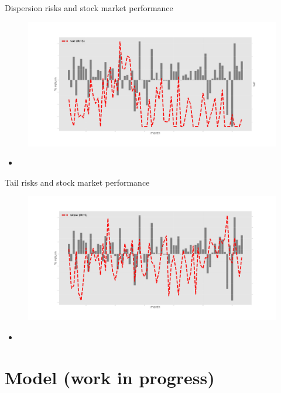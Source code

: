 \documentclass{beamer}
\begin{document}
\begin{frame}{Dispersion risks and stock market performance}
	\begin{figure}
		\centering
		\label{ts_var}
		\includegraphics[width=\textwidth]{figures/tsMedvar.jpg}
	\end{figure}
	\begin{itemize}
		\item 
	\end{itemize}
\end{frame}



\begin{frame}{Tail risks and stock market performance}
	\begin{figure}
		\centering
		\label{ts_skew}
		\includegraphics[width=\textwidth]{figures/tsEstMeanskew.jpg}
	\end{figure}
	\begin{itemize}
		\item 
	\end{itemize}
\end{frame}


\section{Model (work in progress)}
\end{document}

